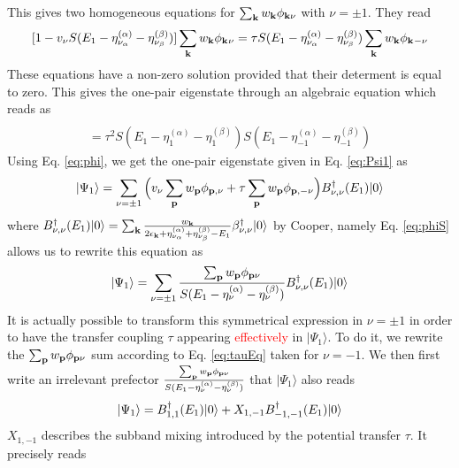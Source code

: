 \documentclass[11pt]{article} %
\newcommand{\ns}[1]{\textcolor{red}{#1}}
\begin{document}
This gives two homogeneous equations for $\sum_{\mathbf{k}}w_{\mathbf{k}}\phi_{\mathbf{k}\nu}$ with $\nu=\pm1$. They read
\begin{equation}\label{eq:tauEq}
[1-v_{\nu}S(E_1-\eta_{\nu_{\alpha}}^{(\alpha)}-\eta_{\nu_{\beta}}^{(\beta)})]\sum_{\mathbf{k}}w_{\mathbf{k}}\phi_{\mathbf{k}^{}\nu}
=\tau{}S(E_1-\eta_{\nu_{\alpha}}^{(\alpha)}-\eta_{\nu_{\beta}}^{(\beta)})\sum_{\mathbf{k}}w_{\mathbf{k}}\phi_{\mathbf{k}^{}-\nu}
\end{equation}
These equations have a non-zero solution provided that their determent is equal to zero.  This gives the one-pair eigenstate through an algebraic  equation which reads as 
\begin{multline}
[1-v_{1}S(E_1-\eta_{1}^{(\alpha)}-\eta_{1}^{(\beta)})][1-v_{-1}S(E_1-\eta_{-1}^{(\alpha)}-\eta_{-1}^{(\beta)})]\\
=\tau^2S(E_1-\eta_{1}^{(\alpha)}-\eta_{1}^{(\beta)})S(E_1-\eta_{-1}^{(\alpha)}-\eta_{-1}^{(\beta)})\label{eq:tauEq2}
\end{multline}
Using Eq. \ref{eq:phi}, we get the one-pair eigenstate given in Eq. \ref{eq:Psi1} as
\begin{equation}
|\Psi_1\rangle=\sum_{\nu=\pm1}\Big(v_{\nu}\sum_{\mathbf{p}}w_{\mathbf{p}}\phi_{\mathbf{p},\nu}+\tau{}\sum_{\mathbf{p}}w_{\mathbf{p}}\phi_{\mathbf{p},-\nu}\Big)B^{\dagger}_{\nu,\nu}(E_{1})|0\rangle
\end{equation}
where $B^{\dagger}_{\nu,\nu}(E_{1})|0\rangle=\sum_{\mathbf{k}}\frac{w_{\mathbf{k}}}{2\epsilon_{\mathbf{k}}+\eta_{\nu_{\alpha}}^{(\alpha)}+\eta_{\nu_{\beta}}^{(\beta)}-E_1}\beta^{\dagger}_{\nu,\nu}|0\rangle$ by Cooper, namely Eq. \ref{eq:phiS} allows us to rewrite this equation as 
\begin{equation}
|\Psi_1\rangle=\sum_{\nu=\pm1}\frac{\sum_{\mathbf{p}}w_{\mathbf{p}}\phi_{\mathbf{p}\nu}}{S(E_1-\eta_{\nu_{}}^{(\alpha)}-\eta_{\nu_{}}^{(\beta)})}B^{\dagger}_{\nu,\nu}(E_{1})|0\rangle
\end{equation}
It is actually possible to transform this symmetrical expression in $\nu=\pm1$ in order to have the transfer coupling $\tau$ appearing \ns{effectively} in $|\Psi_1\rangle$.  To do it, we rewrite the $\sum_{\mathbf{p}}w_{\mathbf{p}}\phi_{\mathbf{p}\nu}$ sum according to Eq. \ref{eq:tauEq} taken for $\nu=-1$.  We then first write an {irrelevant} prefector $\frac{\sum_{\mathbf{p}}w_{\mathbf{p}}\phi_{\mathbf{p}\nu}}{S(E_1-\eta_{\nu_{}}^{(\alpha)}-\eta_{\nu_{}}^{(\beta)})}$ that $|\Psi_1\rangle$ also reads
\begin{equation}\label{eq:Psi1B}
|\Psi_1\rangle=B^{\dagger}_{1,1}(E_{1})|0\rangle+X_{1,-1}B^{\dagger}_{-1,-1}(E_{1})|0\rangle
\end{equation}
$X_{1,-1}$ describes the subband mixing introduced by the potential transfer $\tau$.  It precisely reads
\end{document}
